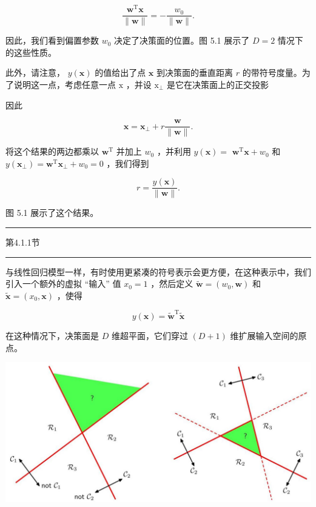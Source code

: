 \documentclass[10pt]{report}
\newcommand{\HRule}{\begin{center}\rule{0.9\linewidth}{0.2mm}\end{center}}
\begin{document}
\[
\frac{{\mathbf{w}}^{\mathrm{T}}\mathbf{x}}{\parallel \mathbf{w}\parallel } =  - \frac{{w}_{0}}{\parallel \mathbf{w}\parallel }. \tag{5.3}
\]

因此，我们看到偏置参数 \({w}_{0}\) 决定了决策面的位置。图 5.1 展示了 \(D = 2\) 情况下的这些性质。

此外，请注意， \(y\left( \mathbf{x}\right)\) 的值给出了点 \(\mathbf{x}\) 到决策面的垂直距离 \(r\) 的带符号度量。为了说明这一点，考虑任意一点 \(\mathrm{x}\) ，并设 \({\mathrm{x}}_{ \bot  }\) 是它在决策面上的正交投影

因此

\[
\mathbf{x} = {\mathbf{x}}_{ \bot  } + r\frac{\mathbf{w}}{\parallel \mathbf{w}\parallel }. \tag{5.4}
\]

将这个结果的两边都乘以 \({\mathbf{w}}^{\mathrm{T}}\) 并加上 \({w}_{0}\) ，并利用 \(y\left( \mathbf{x}\right)  =\)  \({\mathbf{w}}^{\mathrm{T}}\mathbf{x} + {w}_{0}\) 和 \(y\left( {\mathbf{x}}_{ \bot  }\right)  = {\mathbf{w}}^{\mathrm{T}}{\mathbf{x}}_{ \bot  } + {w}_{0} = 0\) ，我们得到

\[
r = \frac{y\left( \mathbf{x}\right) }{\parallel \mathbf{w}\parallel }. \tag{5.5}
\]

图 5.1 展示了这个结果。

\HRule

第4.1.1节

\HRule

与线性回归模型一样，有时使用更紧凑的符号表示会更方便，在这种表示中，我们引入一个额外的虚拟 “输入” 值 \({x}_{0} = 1\) ，然后定义 \(\widetilde{\mathbf{w}} = \left( {{w}_{0},\mathbf{w}}\right)\) 和 \(\widetilde{\mathbf{x}} = \left( {{x}_{0},\mathbf{x}}\right)\) ，使得

\[
y\left( \mathbf{x}\right)  = {\widetilde{\mathbf{w}}}^{\mathrm{T}}\widetilde{\mathbf{x}} \tag{5.6}
\]

在这种情况下，决策面是 \(D\) 维超平面，它们穿过 \(\left( {D + 1}\right)\) 维扩展输入空间的原点。

\begin{center}
\includegraphics[max width=1.0\textwidth]{images/0194e279-9b28-703a-88f4-c3ac21e2010d_153_237_341_1269_581_0.jpg}
\end{center}
\hspace*{3em} 
\end{document}
